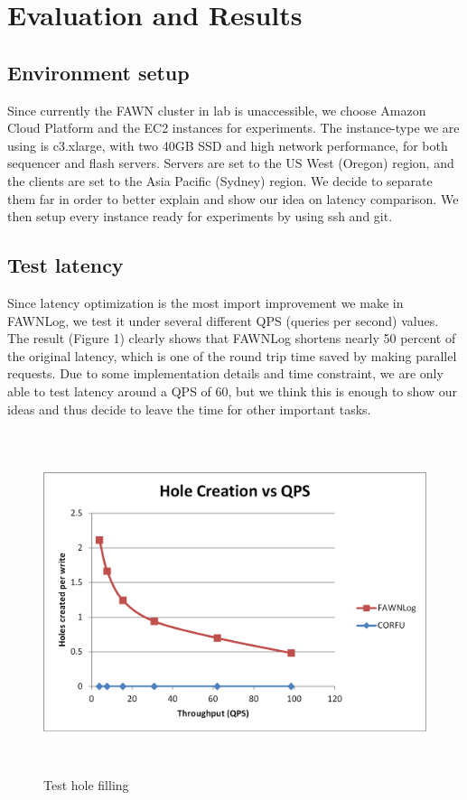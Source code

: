 \documentclass[letterpaper,twocolumn,10pt]{article}
\begin{document}
\section{Evaluation and Results}

\subsection{Environment setup}
Since currently the FAWN cluster in lab is unaccessible, we choose Amazon Cloud Platform and the EC2 instances for experiments. The instance-type we are using is c3.xlarge, with two 40GB SSD and high network performance, for both sequencer and flash servers. Servers are set to the US West (Oregon) region, and the clients are set to the Asia Pacific (Sydney) region. We decide to separate them far in order to better explain and show our idea on latency comparison. We then setup every instance ready for experiments by using ssh and git.

\subsection{Test latency}
Since latency optimization is the most import improvement we make in FAWNLog, we test it under several different QPS (queries per second) values. The result (Figure 1) clearly shows that FAWNLog shortens nearly 50 percent of the original latency, which is one of the round trip time saved by making parallel requests. Due to some implementation details and time constraint, we are only able to test latency around a QPS of 60, but we think this is enough to show our ideas and thus decide to leave the time for other important tasks. 

\begin{center}
\begin{figure}
  \includegraphics[width=\textwidth, height=10cm]{5.png}
  \caption{Test hole filling}
\end{figure}
\end{center}
\end{document}

